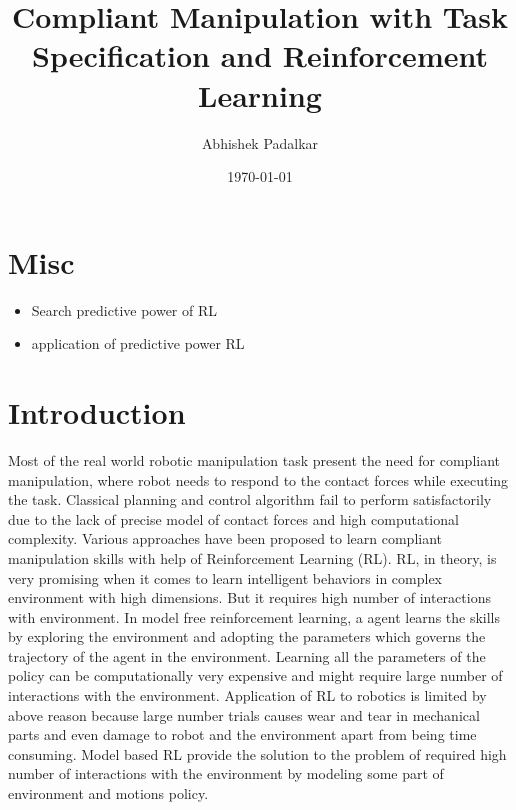 \documentclass[thesis]{mas_proposal}
\title{Compliant Manipulation with Task Specification and Reinforcement Learning}
\author{Abhishek Padalkar}
\date{\today}
\begin{document}
\maketitle

\pagestyle{plain}

\chapter{Misc}
\begin{itemize}
	\item Search predictive power of RL
	\item application of predictive power RL 
\end{itemize}

\chapter{Introduction}
Most of the real world robotic manipulation task present the need for compliant manipulation, where robot needs to respond to the contact forces while executing the task. Classical planning and control algorithm fail to perform satisfactorily due to the lack of precise model of contact forces and high computational complexity. Various approaches have been proposed to learn compliant manipulation skills with help of Reinforcement Learning (RL). RL, in theory, is very promising when it comes to learn intelligent behaviors in complex environment with high dimensions. But it requires high number of interactions with environment. In model free reinforcement learning, a agent learns the skills by exploring the environment and adopting the parameters which governs the trajectory of the agent in the environment. Learning all the parameters of the policy can be computationally very expensive and might require large number of interactions with the environment. Application of RL to robotics is limited by above reason because large number trials causes wear and tear in mechanical parts and even damage to robot and the environment apart from being time consuming. Model based RL provide the solution to the problem of required high number of interactions with the environment by modeling some part of environment and motions policy. 
\end{document}

